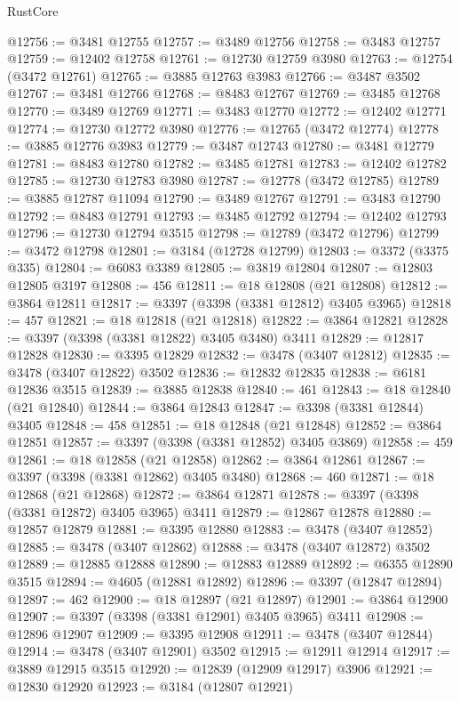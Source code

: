 \begin{lexlean}{RustCore}
\begin{coremodule}
@12756 := @3481 @12755
@12757 := @3489 @12756
@12758 := @3483 @12757
@12759 := @12402 @12758
@12761 := @12730 @12759 @3980
@12763 := @12754 (@3472 @12761)
@12765 := @3885 @12763 @3983
@12766 := @3487 @3502
@12767 := @3481 @12766
@12768 := @8483 @12767
@12769 := @3485 @12768
@12770 := @3489 @12769
@12771 := @3483 @12770
@12772 := @12402 @12771
@12774 := @12730 @12772 @3980
@12776 := @12765 (@3472 @12774)
@12778 := @3885 @12776 @3983
@12779 := @3487 @12743
@12780 := @3481 @12779
@12781 := @8483 @12780
@12782 := @3485 @12781
@12783 := @12402 @12782
@12785 := @12730 @12783 @3980
@12787 := @12778 (@3472 @12785)
@12789 := @3885 @12787 @11094
@12790 := @3489 @12767
@12791 := @3483 @12790
@12792 := @8483 @12791
@12793 := @3485 @12792
@12794 := @12402 @12793
@12796 := @12730 @12794 @3515
@12798 := @12789 (@3472 @12796)
@12799 := @3472 @12798
@12801 := @3184 (@12728 @12799)
@12803 := @3372 (@3375 @335)
@12804 := @6083 @3389
@12805 := @3819 @12804
@12807 := @12803 @12805 @3197
@12808 := 456
@12811 := @18 @12808 (@21 @12808)
@12812 := @3864 @12811
@12817 := @3397 (@3398 (@3381 @12812) @3405 @3965)
@12818 := 457
@12821 := @18 @12818 (@21 @12818)
@12822 := @3864 @12821
@12828 := @3397 (@3398 (@3381 @12822) @3405 @3480) @3411
@12829 := @12817 @12828
@12830 := @3395 @12829
@12832 := @3478 (@3407 @12812)
@12835 := @3478 (@3407 @12822) @3502
@12836 := @12832 @12835
@12838 := @6181 @12836 @3515
@12839 := @3885 @12838
@12840 := 461
@12843 := @18 @12840 (@21 @12840)
@12844 := @3864 @12843
@12847 := @3398 (@3381 @12844) @3405
@12848 := 458
@12851 := @18 @12848 (@21 @12848)
@12852 := @3864 @12851
@12857 := @3397 (@3398 (@3381 @12852) @3405 @3869)
@12858 := 459
@12861 := @18 @12858 (@21 @12858)
@12862 := @3864 @12861
@12867 := @3397 (@3398 (@3381 @12862) @3405 @3480)
@12868 := 460
@12871 := @18 @12868 (@21 @12868)
@12872 := @3864 @12871
@12878 := @3397 (@3398 (@3381 @12872) @3405 @3965) @3411
@12879 := @12867 @12878
@12880 := @12857 @12879
@12881 := @3395 @12880
@12883 := @3478 (@3407 @12852)
@12885 := @3478 (@3407 @12862)
@12888 := @3478 (@3407 @12872) @3502
@12889 := @12885 @12888
@12890 := @12883 @12889
@12892 := @6355 @12890 @3515
@12894 := @4605 (@12881 @12892)
@12896 := @3397 (@12847 @12894)
@12897 := 462
@12900 := @18 @12897 (@21 @12897)
@12901 := @3864 @12900
@12907 := @3397 (@3398 (@3381 @12901) @3405 @3965) @3411
@12908 := @12896 @12907
@12909 := @3395 @12908
@12911 := @3478 (@3407 @12844)
@12914 := @3478 (@3407 @12901) @3502
@12915 := @12911 @12914
@12917 := @3889 @12915 @3515
@12920 := @12839 (@12909 @12917) @3906
@12921 := @12830 @12920
@12923 := @3184 (@12807 @12921)

\end{coremodule}
\end{lexlean}
